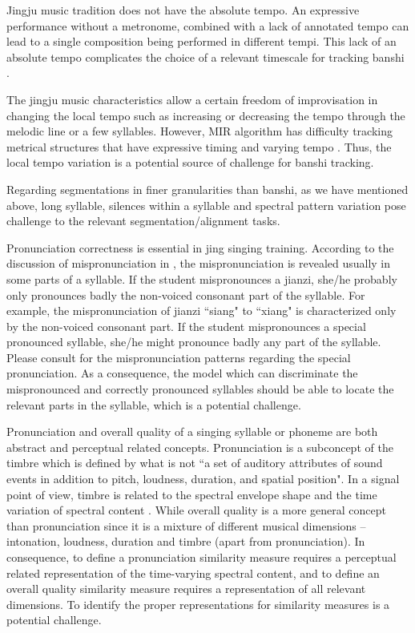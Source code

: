 Jingju music tradition does not have the absolute tempo. An expressive performance without a metronome, combined with a lack of annotated tempo can lead to a single composition being performed in different tempi. This lack of an absolute tempo complicates the choice of a relevant timescale for tracking banshi \cite{Srinivasamurthy2016}.

The jingju music characteristics allow a certain freedom of improvisation in changing the local tempo such as increasing or decreasing the tempo through the melodic line or a few syllables. However, MIR algorithm has difficulty tracking metrical structures that have expressive timing and varying tempo \cite{Holzapfel2012a}. Thus, the local tempo variation is a potential source of challenge for banshi tracking.

Regarding segmentations in finer granularities than banshi, as we have mentioned above, long syllable, silences within a syllable and spectral pattern variation pose challenge to the relevant segmentation/alignment tasks. 

Pronunciation correctness is essential in jing singing training. According to the discussion of mispronunciation in , the mispronunciation is revealed usually in some parts of a syllable. If the student mispronounces a jianzi, she/he probably only pronounces badly the non-voiced consonant part of the syllable. For example, the mispronunciation of jianzi ``siang" to ``xiang" is characterized only by the non-voiced consonant part. If the student mispronounces a special pronounced syllable, she/he might pronounce badly any part of the syllable. Please consult  for the mispronunciation patterns regarding the special pronunciation. As a consequence, the model which can discriminate the mispronounced and correctly pronounced syllables should be able to locate the relevant parts in the syllable, which is a potential challenge.

Pronunciation and overall quality of a singing syllable or phoneme are both abstract and perceptual related concepts. Pronunciation is a subconcept of the timbre which is defined by what is not ``a set of auditory attributes of sound events in addition to pitch, loudness, duration, and spatial position". In a signal point of view, timbre is related to the spectral envelope shape and the time variation of spectral content \cite{Pons2017Timbre}. While overall quality is a more general concept than pronunciation since it is a mixture of different musical dimensions -- intonation, loudness, duration and timbre (apart from pronunciation). In consequence, to define a pronunciation similarity measure requires a perceptual related representation of the time-varying spectral content, and to define an overall quality similarity measure requires a representation of all relevant dimensions. To identify the proper representations for similarity measures is a potential challenge.

